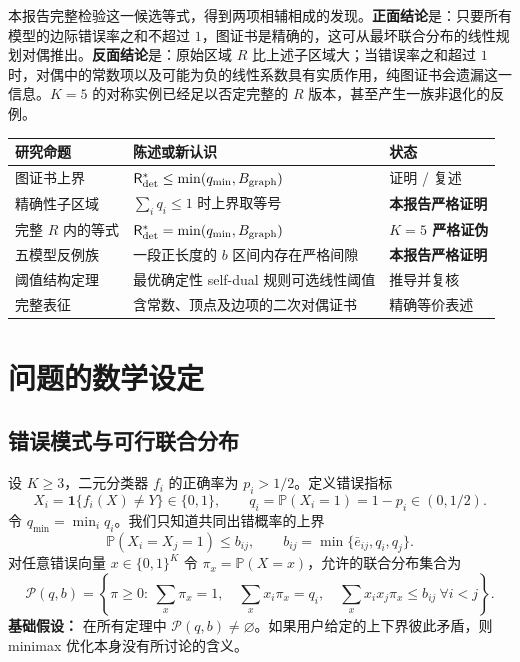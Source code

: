\documentclass[11pt,a4paper]{ctexart}
\theoremstyle{definition}
\newcommand{\PP}{\mathcal P}
\newcommand{\Risk}{\mathsf R}
\newcommand{\I}{\mathbf 1}
\newcommand{\Prb}{\mathbb P}
\begin{document}
本报告完整检验这一候选等式，得到两项相辅相成的发现。\textbf{正面结论}是：只要所有模型的边际错误率之和不超过 $1$，图证书是精确的，这可从最坏联合分布的线性规划对偶推出。\textbf{反面结论}是：原始区域 $R$ 比上述子区域大；当错误率之和超过 $1$ 时，对偶中的常数项以及可能为负的线性系数具有实质作用，纯图证书会遗漏这一信息。$K=5$ 的对称实例已经足以否定完整的 $R$ 版本，甚至产生一族非退化的反例。

\begin{center}
\small
\begin{tabularx}{\textwidth}{@{}p{}X p{}@{}}
\toprule
\textbf{研究命题} & \textbf{陈述或新认识} & \textbf{状态}\\
\midrule
图证书上界 & $\Risk^*_{\rm det}\le\min(q_{\min},B_{\rm graph})$ & 证明 / 复述 \\
精确性子区域 & $\sum_iq_i\le1$ 时上界取等号 & \textbf{本报告严格证明}\\
完整 $R$ 内的等式 & $\Risk^*_{\rm det}=\min(q_{\min},B_{\rm graph})$ & \textbf{$K=5$ 严格证伪}\\
五模型反例族 & 一段正长度的 $b$ 区间内存在严格间隙 & \textbf{本报告严格证明}\\
阈值结构定理 & 最优确定性 self-dual 规则可选线性阈值 & 推导并复核\\
完整表征 & 含常数、顶点及边项的二次对偶证书 & 精确等价表述\\
\bottomrule
\end{tabularx}
\end{center}

\section{问题的数学设定}
\subsection{错误模式与可行联合分布}
设 $K\ge3$，二元分类器 $f_i$ 的正确率为 $p_i>1/2$。定义错误指标
\[
X_i=\I\{f_i(X)\ne Y\}\in\{0,1\},\qquad q_i=\Prb(X_i=1)=1-p_i\in(0,1/2).
\]
令 $q_{\min}=\min_iq_i$。我们只知道共同出错概率的上界
\[
\Prb(X_i=X_j=1)\le b_{ij},\qquad b_{ij}=\min\{\bar e_{ij},q_i,q_j\}.
\]
对任意错误向量 $x\in\{0,1\}^K$ 令 $\pi_x=\Prb(X=x)$，允许的联合分布集合为
\begin{equation}\label{eq:ambiguity}
\PP(q,b)=\left\{\pi\ge0:\ \sum_x\pi_x=1,\quad
\sum_xx_i\pi_x=q_i,\quad
\sum_xx_ix_j\pi_x\le b_{ij}\ \forall i<j\right\}.
\end{equation}
\textbf{基础假设：} 在所有定理中 $\PP(q,b)\ne\varnothing$。如果用户给定的上下界彼此矛盾，则 minimax 优化本身没有所讨论的含义。
\end{document}
